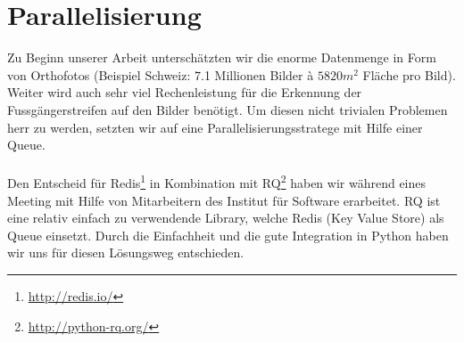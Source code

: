 \section{Parallelisierung}
Zu Beginn unserer Arbeit unterschätzten wir die enorme Datenmenge in Form von Orthofotos (Beispiel Schweiz: 7.1 Millionen Bilder à $5820 m^{2}$ Fläche pro Bild). Weiter wird auch sehr viel Rechenleistung für die Erkennung der Fussgängerstreifen auf den Bilder benötigt. Um diesen nicht trivialen Problemen herr zu werden, setzten wir auf eine Parallelisierungsstratege mit Hilfe einer Queue. \\ \\

Den Entscheid für Redis\footnote{\url{http://redis.io/}} in Kombination mit RQ\footnote{\url{http://python-rq.org/}} haben wir während eines Meeting mit Hilfe von Mitarbeitern des Institut für Software erarbeitet. RQ ist eine relativ einfach zu verwendende Library, welche Redis (Key Value Store) als Queue einsetzt. Durch die Einfachheit und die gute Integration in Python haben wir uns für diesen Lösungsweg entschieden.

\newpage
